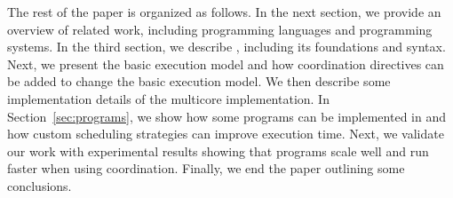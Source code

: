 The rest of the paper is organized as follows. In the next section, we provide an overview of related work, including
programming languages and programming systems. In the third section, we describe \lang, including its foundations and syntax.
Next, we present the basic execution model and how coordination directives can be added to change the basic execution model.
We then describe some implementation details of the multicore implementation.
In Section~\ref{sec:programs}, we show how some programs can be implemented in \lang and how custom scheduling strategies
can improve execution time.
Next, we validate our work with experimental results showing that \lang programs scale well and run faster when using coordination.
Finally, we end the paper outlining some conclusions.
